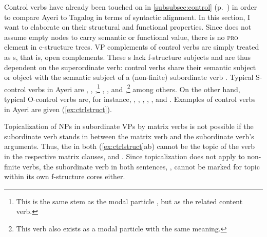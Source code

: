 Control verbs have already been touched on in \autoref{subsubsec:control}
(p.~\pageref{subsubsec:control}) in order to compare Ayeri to Tagalog in terms
of syntactic alignment. In this section, I want to elaborate on their
structural and functional properties. Since \Lfg{} does not assume empty nodes
to carry semantic or functional value, there is no \textsc{pro} element in
c-structure trees. VP complements of control verbs are simply treated as
\XCompl{}s, that is, open complements. These \XCompl{}s lack f-structure
subjects and are thus dependent on the superordinate verb: control verbs share
their semantic subject or object with the semantic subject of a (non-finite)
subordinate verb \citep[289\psqq]{bresnan2016}.
Typical S-control verbs in Ayeri are
,
,
,\footnote{This is the same stem as the modal particle 
, but as the related content verb.}
,
, and
,\footnote{This verb also exists as a modal particle
 with the same meaning.}
among others. On the other hand, typical O-control verbs are, for instance,
,
,
,
,
, and
. Examples of control verbs in Ayeri
are given (\ref{ex:ctrlstruct}).

Topicalization of NPs in subordinate VPs by matrix verbs is not possible if the
subordinate verb stands in between the matrix verb and the subordinate verb's
arguments. Thus, the  in both
(\ref{ex:ctrlstruct}ab) cannot be the topic of the verb in the respective
matrix clauses,  and
. Since topicalization does not apply to
non-finite verbs, the subordinate verb in both sentences,
, cannot be marked for topic within its own
f-structure cores either.


